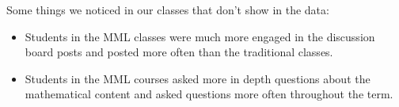 Some things we noticed in our classes that don't show in the data:
\begin{itemize}
  \item Students in the MML classes were much more engaged in the discussion board posts and posted more often than the traditional classes.
  \item Students in the MML courses asked more in depth questions about the mathematical content and asked questions more often throughout the term.
\end{itemize}










